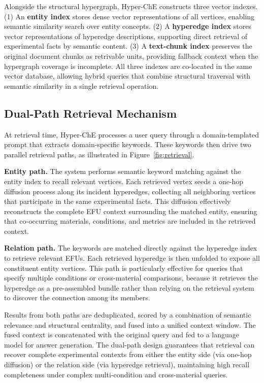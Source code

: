Alongside the structural hypergraph, Hyper-ChE constructs three vector indexes. (1) An \textbf{entity index} stores dense vector representations of all vertices, enabling semantic similarity search over entity concepts. (2) A \textbf{hyperedge index} stores vector representations of hyperedge descriptions, supporting direct retrieval of experimental facts by semantic content. (3) A \textbf{text-chunk index} preserves the original document chunks as retrivable units, providing fallback context when the hypergraph coverage is incomplete. All three indexes are co-located in the same vector database, allowing hybrid queries that combine structural traversal with semantic similarity in a single retrieval operation.

\subsection{Dual-Path Retrieval Mechanism}
\label{subsec:retrieval}

At retrieval time, Hyper-ChE processes a user query through a domain-templated prompt that extracts domain-specific keywords. These keywords then drive two parallel retrieval paths, as illustrated in Figure~\ref{fig:retrieval}.

\textbf{Entity path.} The system performs semantic keyword matching against the entity index to recall relevant vertices. Each retrieved vertex seeds a one-hop diffusion process along its incident hyperedges, collecting all neighboring vertices that participate in the same experimental facts. This diffusion effectively reconstructs the complete EFU context surrounding the matched entity, ensuring that co-occurring materials, conditions, and metrics are included in the retrieved context.

\textbf{Relation path.} The keywords are matched directly against the hyperedge index to retrieve relevant EFUs. Each retrieved hyperedge is then unfolded to expose all constituent entity vertices. This path is particularly effective for queries that specify multiple conditions or cross-material comparisons, because it retrieves the hyperedge as a pre-assembled bundle rather than relying on the retrieval system to discover the connection among its members.

Results from both paths are deduplicated, scored by a combination of semantic relevance and structural centrality, and fused into a unified context window. The fused context is concatenated with the original query and fed to a language model for answer generation. The dual-path design guarantees that retrieval can recover complete experimental contexts from either the entity side (via one-hop diffusion) or the relation side (via hyperedge retrieval), maintaining high recall completeness under complex multi-condition and cross-material queries.

